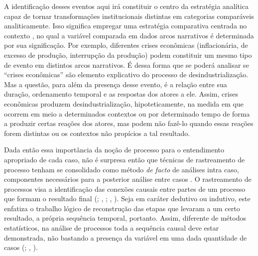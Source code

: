 A identificação desses eventos aqui irá constituir o centro da
estratégia analítica capaz de tornar transformações institucionais
distintas em categorias comparáveis analiticamente. Isso significa
empregar uma estratégia comparativa centrada no contexto
\citep{locke_apples_1995}, no qual a variável comparada em dados arcos
narrativos é determinada por sua significação. Por exemplo, diferentes
crises econômicas (inflacionária, de excesso de produção, interrupção
da produção) podem constituir um mesmo tipo de evento em distintos
arcos narrativos. É dessa forma que se poderá analisar se ``crises
econômicas'' são elemento explicativo do processo de
desindustrialização. Mas a questão, para além da presença desse evento,
é a relação entre sua duração, ordenamento temporal e as respostas dos
atores a ele. Assim, crises econômicas produzem desindustrialização,
hipoteticamente, na medida em que ocorrem em meio a determinados
contextos ou por determinado tempo de forma a produzir certas reações
dos atores, mas podem não fazê-lo quando essas reações forem distintas
ou os contextos não propícios a tal resultado.

Dada então essa importância da noção de processo para o entendimento
apropriado de cada caso, não é surpresa então que técnicas de
rastreamento de processo tenham se consolidado como método \emph{de
facto} de análises intra caso, componentes necessários para a posterior
análise entre casos \citep{mahoney_comparative-historical_2004}. O
rastreamento de processos visa a identificação das conexões causais
entre partes de um processo que formam o resultado final (; \citeauthor{george_case_2005}, \citeyear{george_case_2005};
\citeauthor{mahoney_strategies_2003}, \citeyear{mahoney_strategies_2003}).
Seja em caráter dedutivo ou indutivo, este enfatiza o trabalho lógico de
reconstrução das etapas que levaram a um certo resultado, a própria
sequência temporal, portanto. Assim, diferente de métodos estatísticos,
na análise de processos toda a sequência causal deve estar demonstrada,
não bastando a presença da variável em uma dada quantidade de casos
(; \citeauthor{george_case_2005},
\citeyear{george_case_2005}).

